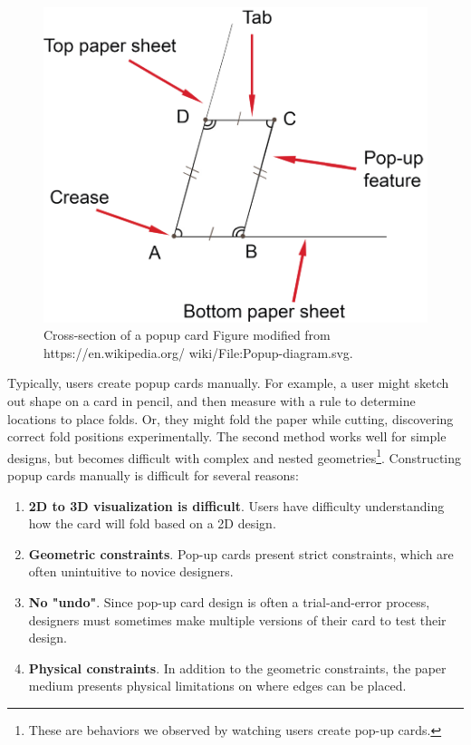 \begin{figure}[htbp]
\centering
\includegraphics{figures/shared/01_Background/popup-diagram.pdf}
\caption{Cross-section of a popup card Figure modified from
https://en.wikipedia.org/ wiki/File:Popup-diagram.svg.}
\end{figure}

Typically, users create popup cards manually. For example, a user might
sketch out shape on a card in pencil, and then measure with a rule to
determine locations to place folds. Or, they might fold the paper while
cutting, discovering correct fold positions experimentally. The second
method works well for simple designs, but becomes difficult with complex
and nested geometries\footnote{These are behaviors we observed by
  watching users create pop-up cards.}. Constructing popup cards
manually is difficult for several reasons:

\begin{enumerate}
\def\labelenumi{\arabic{enumi}.}
\itemsep1pt\parskip0pt
\item
  \textbf{2D to 3D visualization is difficult}. Users have difficulty
  understanding how the card will fold based on a 2D design.
\item
  \textbf{Geometric constraints}. Pop-up cards present strict
  constraints, which are often unintuitive to novice designers.\\
\item
  \textbf{No "undo"}. Since pop-up card design is often a
  trial-and-error process, designers must sometimes make multiple
  versions of their card to test their design.
\item
  \textbf{Physical constraints}. In addition to the geometric
  constraints, the paper medium presents physical limitations on where
  edges can be placed.
\end{enumerate}

